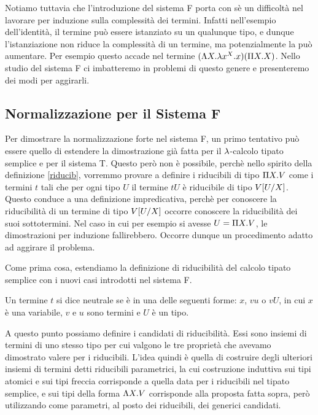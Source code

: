 \documentclass[]{marticle}
\begin{document}
Notiamo tuttavia che l'introduzione del sistema F porta con s\`e un difficolt\`a
nel lavorare per induzione sulla complessit\`a dei termini. Infatti nell'esempio
dell'identit\`a, il termine pu\`o essere istanziato su un qualunque tipo, e
dunque l'istanziazione non riduce la complessit\`a di un termine, ma
potenzialmente la pu\`o aumentare. Per esempio questo accade nel termine $(\L X.
\l x^X. x)(\P X. X)$. Nello studio del sistema F ci imbatteremo in problemi di
questo genere e presenteremo dei modi per aggirarli.

\subsection{Normalizzazione per il Sistema F}
Per dimostrare la normalizzazione forte nel sistema F, un primo tentativo pu\`o
essere quello di estendere la dimostrazione gi\`a fatta per il $\l$-calcolo
tipato semplice e per il sistema T. Questo per\`o non \`e possibile, perch\`e
nello spirito della definizione \ref{riducib}, vorremmo
provare a definire i riducibili di tipo $\P X. V$ come i termini $t$ tali che
per ogni tipo $U$ il termine $tU$ \`e riducibile di tipo $V\sub{U}{X}$. Questo
conduce a una definizione impredicativa, perch\`e per conoscere la
riducibilit\`a di un termine di tipo $V\sub{U}{X}$ occorre conoscere la
riducibilit\`a dei suoi sottotermini. Nel caso in cui per esempio si avesse $U =
\P X.V$, le dimostrazioni per induzione fallirebbero. Occorre dunque un
procedimento adatto ad aggirare il problema.

Come prima cosa, estendiamo la definizione di riducibilit\`a del calcolo tipato
semplice con i nuovi casi introdotti nel sistema F.
\begin{block}[Definizione]
    Un termine $t$ si dice neutrale se \`e in una delle seguenti forme: $x$,
    $vu$ o $vU$, in cui $x$ \`e una variabile, $v$ e $u$ sono termini e $U$ \`e
    un tipo.
\end{block}

A questo punto possiamo definire i candidati di riducibilit\`a. Essi sono
insiemi di termini di uno stesso tipo per cui valgono le tre propriet\`a che
avevamo dimostrato valere per i riducibili. L'idea quindi \`e quella di
costruire degli ulteriori insiemi di termini detti riducibili parametrici, la
cui costruzione induttiva sui tipi atomici e sui tipi freccia corrisponde a
quella data per i riducibili nel tipato semplice, e sui tipi della forma $\L
X.V$ corrisponde alla proposta fatta sopra, per\`o utilizzando come parametri,
al posto dei riducibili, dei generici candidati.
\end{document}
